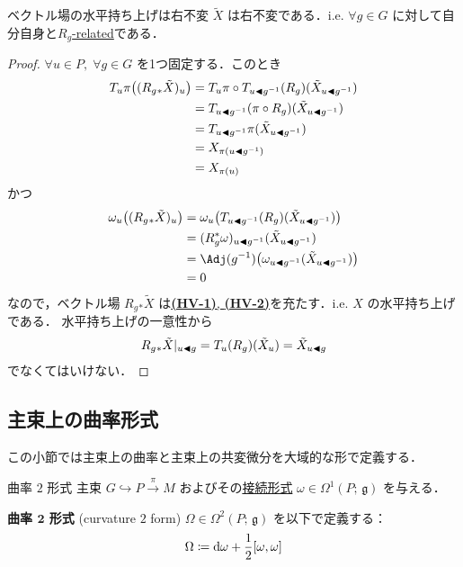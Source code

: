 \documentclass[TQFT_main]{subfiles}
\begin{document}
\begin{myprop}[label=prop:horizontal-lift-vecf]{ベクトル場の水平持ち上げは右不変}
    $\tilde{X}$ は右不変である．i.e. $\forall g \in G$ に対して自分自身と\hyperref[def:F-rel]{$R_g$-related}である．
\end{myprop}

\begin{proof}
    $\forall u \in P,\; \forall g \in G$ を1つ固定する．このとき
    \begin{align}
        T_{u} \pi \bigl( (R_g{}_* \tilde{X})_{u} \bigr) 
        &= T_{u} \pi \circ T_{u \blacktriangleleft g^{-1}} (R_{g}) (\tilde{X}_{u \blacktriangleleft g^{-1}}) \\
        &= T_{u \blacktriangleleft g^{-1}} (\pi \circ R_g) (\tilde{X}_{u \blacktriangleleft g^{-1}}) \\
        &= T_{u \blacktriangleleft g^{-1}} \pi (\tilde{X}_{u \blacktriangleleft g^{-1}}) \\
        &= X_{\pi(u \blacktriangleleft g^{-1})} \\
        &= X_{\pi(u)}
    \end{align}
    かつ
    \begin{align}
        \omega_{u} \bigl( (R_g{}_* \tilde{X})_u \bigr) 
        &= \omega_{u} \bigl( T_{u \btl g^{-1}} (R_{g}) (\tilde{X}_{u \btl g^{-1}}) \bigr) \\
        &= (R_g^* \omega)_{u \btl g^{-1}} (\tilde{X}_{u \btl g^{-1}}) \\
        &= \Adj (g^{-1}) \bigl( \omega_{u \btl g^{-1}} (\tilde{X}_{u \btl g^{-1}}) \bigr)  \\
        &= 0
    \end{align}
    なので，ベクトル場 $R_g{}_* \tilde{X}$ は\hyperref[def:horizontal-lift-vecf]{\textsf{\textbf{(HV-1)}}, \textsf{\textbf{(HV-2)}}}を充たす．i.e. $X$ の水平持ち上げである．
    水平持ち上げの一意性から
    \begin{align}
        R_g{}_* \tilde{X}|_{u \blacktriangleleft g} = T_u (R_g)(\tilde{X}_u) = \tilde{X}_{u \blacktriangleleft g}
    \end{align}
    でなくてはいけない．
\end{proof}

\subsection{主束上の曲率形式}

この小節では主束上の曲率と主束上の共変微分を大域的な形で定義する．

\begin{mydef}[label=def:curvature]{曲率 $2$ 形式}
    主束 $G \hookrightarrow P \xrightarrow{\pi} M$ およびその\hyperref[def:connection]{接続形式} $\omega \in \Omega^1(P;\, \mathfrak{g})$ を与える．
    
    \textbf{曲率 $\bm{2}$ 形式} (curvature $2$ form) $\Omega \in \Omega^2(P;\, \mathfrak{g})$ を以下で定義する：
    \begin{align}
        \Omega \coloneqq \dd{\omega} + \frac{1}{2} \comm{\omega}{\omega}
    \end{align}
\end{mydef}
\end{document}
